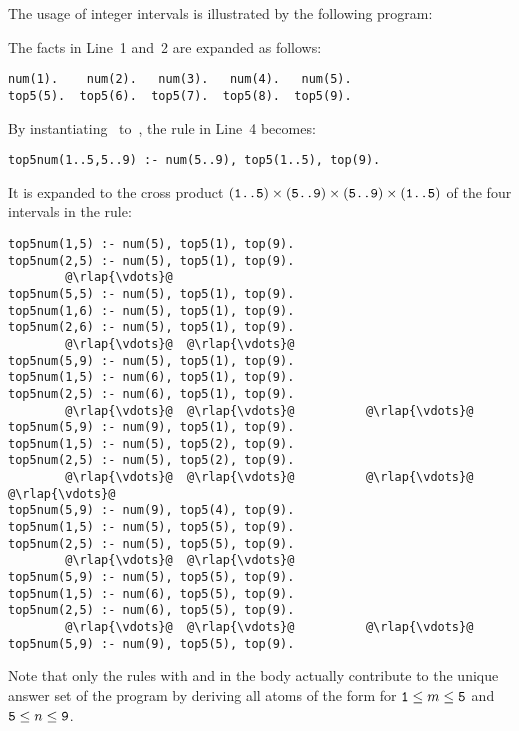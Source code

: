 \begin{example}\label{ex:int}
The usage of integer intervals is illustrated by the following program:
%

%
The facts in Line~1 and~2 are expanded as follows:
%
\begin{lstlisting}[numbers=none]
num(1).    num(2).   num(3).   num(4).   num(5).
top5(5).  top5(6).  top5(7).  top5(8).  top5(9).
\end{lstlisting}
%
By instantiating~ to~,
the rule in Line~4 becomes:
%
\begin{lstlisting}[numbers=none]
top5num(1..5,5..9) :- num(5..9), top5(1..5), top(9).
\end{lstlisting}
%
It is expanded to the cross product
$(\texttt{\texttt{1}..\texttt{5}})\times
 (\texttt{\texttt{5}..\texttt{9}})\times
 (\texttt{\texttt{5}..\texttt{9}})\times
 (\texttt{\texttt{1}..\texttt{5}})$
of the four intervals in the rule:
%
\begin{lstlisting}[numbers=none,escapechar=@]
top5num(1,5) :- num(5), top5(1), top(9).
top5num(2,5) :- num(5), top5(1), top(9).
        @\rlap{\vdots}@
top5num(5,5) :- num(5), top5(1), top(9).
top5num(1,6) :- num(5), top5(1), top(9).
top5num(2,6) :- num(5), top5(1), top(9).
        @\rlap{\vdots}@  @\rlap{\vdots}@
top5num(5,9) :- num(5), top5(1), top(9).
top5num(1,5) :- num(6), top5(1), top(9).
top5num(2,5) :- num(6), top5(1), top(9).
        @\rlap{\vdots}@  @\rlap{\vdots}@          @\rlap{\vdots}@
top5num(5,9) :- num(9), top5(1), top(9).
top5num(1,5) :- num(5), top5(2), top(9).
top5num(2,5) :- num(5), top5(2), top(9).
        @\rlap{\vdots}@  @\rlap{\vdots}@          @\rlap{\vdots}@         @\rlap{\vdots}@
top5num(5,9) :- num(9), top5(4), top(9).
top5num(1,5) :- num(5), top5(5), top(9).
top5num(2,5) :- num(5), top5(5), top(9).
        @\rlap{\vdots}@  @\rlap{\vdots}@
top5num(5,9) :- num(5), top5(5), top(9).
top5num(1,5) :- num(6), top5(5), top(9).
top5num(2,5) :- num(6), top5(5), top(9).
        @\rlap{\vdots}@  @\rlap{\vdots}@          @\rlap{\vdots}@
top5num(5,9) :- num(9), top5(5), top(9).
\end{lstlisting}
%
Note that only the rules with
 and
%
%
in the body actually contribute to the unique answer set
of the program by deriving all atoms 
of the form 
for $\texttt{1}\leq m\leq\texttt{5}$ and $\texttt{5}\leq n\leq\texttt{9}$.
\eexample
\end{example}

